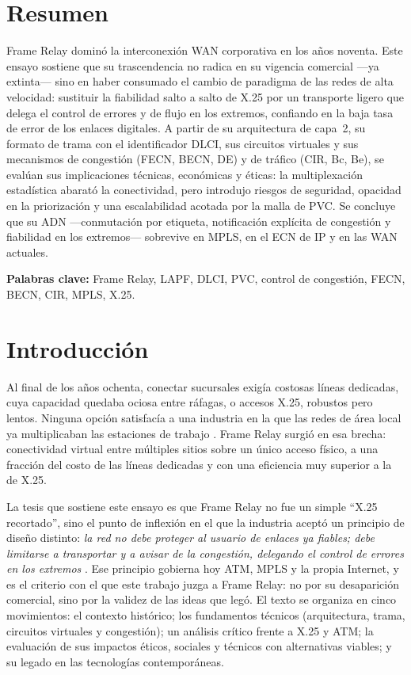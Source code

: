 \documentclass[12pt,a4paper]{article}
\begin{document}
\section{Resumen}

Frame Relay dominó la interconexión WAN corporativa en los años noventa. Este ensayo sostiene que su trascendencia no radica en su vigencia comercial ---ya extinta--- sino en haber consumado el cambio de paradigma de las redes de alta velocidad: sustituir la fiabilidad salto a salto de X.25 por un transporte ligero que delega el control de errores y de flujo en los extremos, confiando en la baja tasa de error de los enlaces digitales. A partir de su arquitectura de capa~2, su formato de trama con el identificador DLCI, sus circuitos virtuales y sus mecanismos de congestión (FECN, BECN, DE) y de tráfico (CIR, Bc, Be), se evalúan sus implicaciones técnicas, económicas y éticas: la multiplexación estadística abarató la conectividad, pero introdujo riesgos de seguridad, opacidad en la priorización y una escalabilidad acotada por la malla de PVC. Se concluye que su ADN ---conmutación por etiqueta, notificación explícita de congestión y fiabilidad en los extremos--- sobrevive en MPLS, en el ECN de IP y en las WAN actuales.

\noindent\textbf{Palabras clave:} Frame Relay, LAPF, DLCI, PVC, control de congestión, FECN, BECN, CIR, MPLS, X.25.

\section{Introducción}

Al final de los años ochenta, conectar sucursales exigía costosas líneas dedicadas, cuya capacidad quedaba ociosa entre ráfagas, o accesos X.25, robustos pero lentos. Ninguna opción satisfacía a una industria en la que las redes de área local ya multiplicaban las estaciones de trabajo \cite{stallings2014, kurose2017}. Frame Relay surgió en esa brecha: conectividad virtual entre múltiples sitios sobre un único acceso físico, a una fracción del costo de las líneas dedicadas y con una eficiencia muy superior a la de X.25.

La tesis que sostiene este ensayo es que Frame Relay no fue un simple ``X.25 recortado'', sino el punto de inflexión en el que la industria aceptó un principio de diseño distinto: \emph{la red no debe proteger al usuario de enlaces ya fiables; debe limitarse a transportar y a avisar de la congestión, delegando el control de errores en los extremos} \cite{saltzer1984}. Ese principio gobierna hoy ATM, MPLS y la propia Internet, y es el criterio con el que este trabajo juzga a Frame Relay: no por su desaparición comercial, sino por la validez de las ideas que legó. El texto se organiza en cinco movimientos: el contexto histórico; los fundamentos técnicos (arquitectura, trama, circuitos virtuales y congestión); un análisis crítico frente a X.25 y ATM; la evaluación de sus impactos éticos, sociales y técnicos con alternativas viables; y su legado en las tecnologías contemporáneas.
\end{document}
